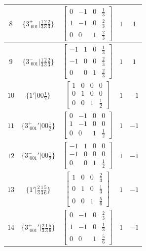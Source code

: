 \documentclass[fleqn,8pt]{jsarticle}
\begin{document}
\begin{longtable}{ccccc}
$ 8 $ & $ \{3^{+}_{\,\,001}|\frac{1}{3} \frac{2}{3} \frac{2}{3}\} $ & $ \begin{bmatrix} 0 & -1 & 0 & \frac{1}{3} \\ 1 & -1 & 0 & \frac{2}{3} \\ 0 & 0 & 1 & \frac{2}{3} \end{bmatrix} $ & $ 1 $ & $ 1 $ \\ \hline
$ 9 $ & $ \{3^{-}_{\,\,001}|\frac{1}{3} \frac{2}{3} \frac{2}{3}\} $ & $ \begin{bmatrix} -1 & 1 & 0 & \frac{1}{3} \\ -1 & 0 & 0 & \frac{2}{3} \\ 0 & 0 & 1 & \frac{2}{3} \end{bmatrix} $ & $ 1 $ & $ 1 $ \\ \hline
$ 10 $ & $ \{1{}'|0 0 \frac{1}{2}\} $ & $ \begin{bmatrix} 1 & 0 & 0 & 0 \\ 0 & 1 & 0 & 0 \\ 0 & 0 & 1 & \frac{1}{2} \end{bmatrix} $ & $ 1 $ & $ -1 $ \\ \hline
$ 11 $ & $ \{3^{+}_{\,\,001}{}'|0 0 \frac{1}{2}\} $ & $ \begin{bmatrix} 0 & -1 & 0 & 0 \\ 1 & -1 & 0 & 0 \\ 0 & 0 & 1 & \frac{1}{2} \end{bmatrix} $ & $ 1 $ & $ -1 $ \\ \hline
$ 12 $ & $ \{3^{-}_{\,\,001}{}'|0 0 \frac{1}{2}\} $ & $ \begin{bmatrix} -1 & 1 & 0 & 0 \\ -1 & 0 & 0 & 0 \\ 0 & 0 & 1 & \frac{1}{2} \end{bmatrix} $ & $ 1 $ & $ -1 $ \\ \hline
$ 13 $ & $ \{1{}'|\frac{2}{3} \frac{1}{3} \frac{5}{6}\} $ & $ \begin{bmatrix} 1 & 0 & 0 & \frac{2}{3} \\ 0 & 1 & 0 & \frac{1}{3} \\ 0 & 0 & 1 & \frac{5}{6} \end{bmatrix} $ & $ 1 $ & $ -1 $ \\ \hline
$ 14 $ & $ \{3^{+}_{\,\,001}{}'|\frac{2}{3} \frac{1}{3} \frac{5}{6}\} $ & $ \begin{bmatrix} 0 & -1 & 0 & \frac{2}{3} \\ 1 & -1 & 0 & \frac{1}{3} \\ 0 & 0 & 1 & \frac{5}{6} \end{bmatrix} $ & $ 1 $ & $ -1 $ \\ \hline

\end{longtable}
\end{document}
